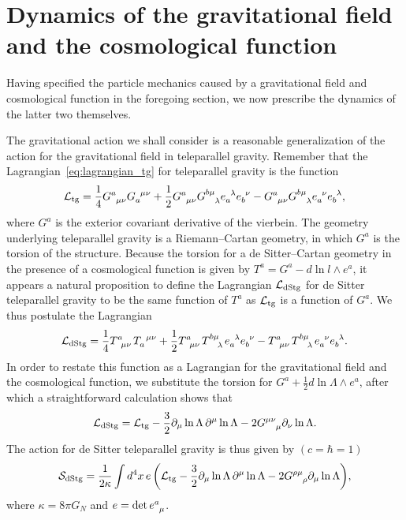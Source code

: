 \documentclass[
final,
11pt,
a4paper,
DIV=11,
headinclude=true,
footinclude=false,
bibliography=totoc,
twoside=true,  %
BCOR=5mm
]{scrbook}
\begin{document}
\section{Dynamics of the gravitational field and the cosmological 
  function}
\label{sec:dyn_grav_dStg}

Having specified the particle mechanics caused by a gravitational 
field and cosmological function in the foregoing section, we now 
prescribe the dynamics of the latter two themselves.

The gravitational action we shall consider is a reasonable 
generalization of the action for the gravitational field in 
teleparallel gravity. Remember that the 
Lagrangian~\eqref{eq:lagrangian_tg} for teleparallel gravity is 
the function
\begin{equation*}
  \mc{L}_\mrm{tg} = \frac{1}{4} G \ind{^a_{\mu\nu}} 
  G\ind{_a^{\mu\nu}} + \frac{1}{2} G\ind{^a_{\mu\nu}} 
  G\ind{^{b\mu}_\lambda} e\ind{_a^\lambda} e\ind{_b^\nu} 
  - G\ind{^a_{\mu\nu}} G\ind{^{b\mu}_\lambda} e\ind{_a^\nu} 
  e\ind{_b^\lambda},
\end{equation*}
where $G^a$ is the exterior covariant derivative of the vierbein. 
The geometry underlying teleparallel gravity is a Riemann--Cartan 
geometry, in which $G^a$ is the torsion of the structure. Because 
the torsion for a de Sitter--Cartan geometry in the presence of 
a cosmological function is given by $T^a = G^a - d\ln l \wedge 
e^a$, it appears a natural proposition to define the Lagrangian 
$\mathcal{L}_\mathrm{dStg}$ for de Sitter teleparallel gravity to be the 
same function of $T^a$ as $\mathcal{L}_\mathrm{tg}$ is a function of 
$G^a$. We thus postulate the Lagrangian
\begin{equation*}
  \mc{L}_\mrm{dStg} = \frac{1}{4} T \ind{^a_{\mu\nu}} 
  T\ind{_a^{\mu\nu}} + \frac{1}{2} T\ind{^a_{\mu\nu}} 
  T\ind{^{b\mu}_\lambda} e\ind{_a^\lambda} e\ind{_b^\nu} 
  - T\ind{^a_{\mu\nu}} T\ind{^{b\mu}_\lambda} e\ind{_a^\nu} 
  e\ind{_b^\lambda}.
\end{equation*}
In order to restate this function as a Lagrangian for the 
gravitational field and the cosmological function, we substitute 
the torsion for $G^a + \tfrac{1}{2} d\ln \Lambda \wedge e^a$, 
after which a straightforward calculation shows that
\begin{equation}
\label{eq:lagrangian_dStg}
  \mc{L}_\mrm{dStg} = \mc{L}_\mrm{tg} - \frac{3}{2} \pd_\mu \ln 
  \Lambda\, \pd^\mu \ln \Lambda - 2 G\ind{^{\mu\nu}_\mu} \pd_\nu 
  \ln \Lambda.
\end{equation}
The action for de Sitter teleparallel gravity is thus given by 
$(c = \hbar = 1)$
\begin{equation}
\label{eq:action_dStg}
  \mc{S}_\mrm{dStg} = \frac{1}{2 \kappa} \int d^4 x \, e \, 
  \bigg( \mc{L}_\mrm{tg} - \frac{3}{2} \pd_\mu \ln \Lambda\, 
  \pd^\mu \ln \Lambda - 2 G\ind{^{\rho\mu}_\rho} \pd_\mu \ln 
  \Lambda \bigg),
\end{equation}
where $\kappa = 8\pi G_N$ and $e = \det e\ind{^a_\mu}$.
\end{document}
